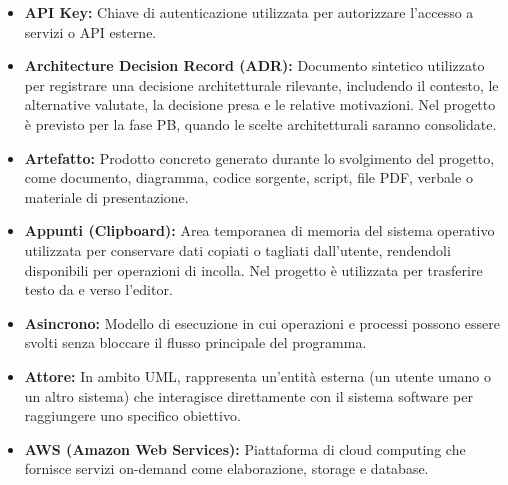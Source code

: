 \begin{itemize}[leftmargin=*]
      \item \textbf{API Key:} Chiave di autenticazione utilizzata per autorizzare l’accesso a servizi o API esterne.
      \item \textbf{Architecture Decision Record (ADR):} Documento sintetico utilizzato per registrare una decisione architetturale rilevante, includendo il contesto, le alternative valutate, la decisione presa e le relative motivazioni. Nel progetto è previsto per la fase PB, quando le scelte architetturali saranno consolidate.
      \item \textbf{Artefatto:} Prodotto concreto generato durante lo svolgimento del progetto, come documento, diagramma, codice sorgente, script, file PDF, verbale o materiale di presentazione.
      \item \textbf{Appunti (Clipboard):} Area temporanea di memoria del sistema operativo utilizzata per conservare dati copiati o tagliati dall'utente, rendendoli disponibili per operazioni di incolla. Nel progetto è utilizzata per trasferire testo da e verso l'editor.
      \item \textbf{Asincrono:} Modello di esecuzione in cui operazioni e processi possono essere svolti senza bloccare il flusso principale del programma.   
      \item \textbf{Attore:} In ambito UML, rappresenta un'entità esterna (un utente umano o un altro sistema) che interagisce direttamente con il sistema software per raggiungere uno specifico obiettivo.
      \item \textbf{AWS (Amazon Web Services):} Piattaforma di cloud computing che fornisce servizi on-demand come elaborazione, storage e database.
      \end{itemize}
 
{}
